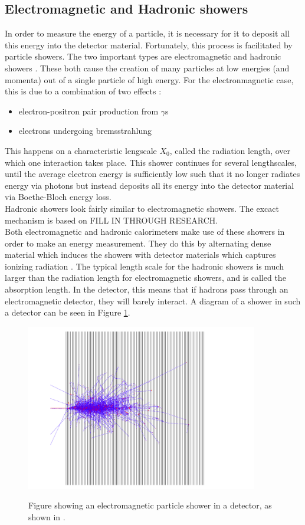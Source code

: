 \documentclass[12 pt]{article}
\begin{document}
		\subsection{Electromagnetic and Hadronic showers}
			In order to measure the energy of a particle, it is necessary for it to deposit all this energy into the detector material. Fortunately, this process is facilitated by particle showers. The two important types are electromagnetic and hadronic showers \cite{notes13}. These both cause the creation of many particles at low energies (and momenta) out of a single particle of high energy. For the electronmagnetic case, this is due to a combination of two effects \cite{notes13}: 
			\begin{itemize}
				\item electron-positron pair production from $\gamma$s
				\item electrons undergoing bremsstrahlung
			\end{itemize}
			This happens on a characteristic lengscale $X_0$, called the radiation length, over which one interaction takes place. This shower continues for several lengthscales, until the average electron energy is sufficiently low such that it no longer radiates energy via photons but instead deposits all its energy into the detector material via Boethe-Bloch energy loss.\\
			Hadronic showers look fairly similar to electromagnetic showers. The excact mechanism is based on FILL IN THROUGH RESEARCH. \\
			Both electromagnetic and hadronic calorimeters make use of these showers in order to make an energy measurement. They do this by alternating dense material which induces the showers with detector materials which captures ionizing radiation \cite{notes13}. The typical length scale for the hadronic showers is much larger than the radiation length for electromagnetic showers, and is called the absorption length. In the detector, this means that if hadrons pass through an electromagnetic detector, they will barely interact. A diagram of a shower in such a detector can be seen in Figure \ref{particle_shower}.
			\begin{figure}[h]
				\centering
				\includegraphics[width=0.9\textwidth]{particle_shower.png}
				\label{particle_shower}
				\caption{Figure showing an electromagnetic particle shower in a detector, as shown in \cite{notes13}.}
			\end{figure}
\end{document}
